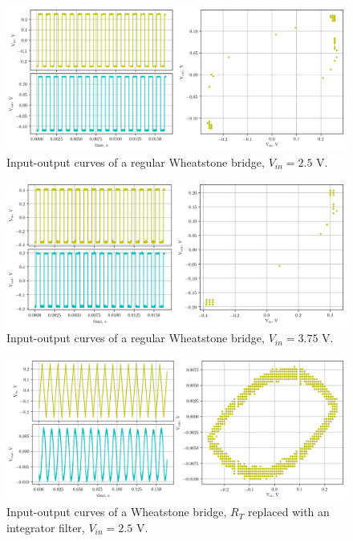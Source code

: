 \documentclass[12pt,a4paper,twoside]{article}
\begin{document}
\begin{figure}[!h]
    \centering
    \includegraphics[width = \textwidth]{r1.png}
    \caption{Input-output curves of a regular Wheatstone bridge, $V_{in} = 2.5$ V.}
    \label{fig:res-lo}
\end{figure}

\begin{figure}[!h]
    \centering
    \includegraphics[width = \textwidth]{r2.png}
    \caption{Input-output curves of a regular Wheatstone bridge, $V_{in} = 3.75$ V.}
    \label{fig:res-hi}
\end{figure}

\begin{figure}[!h]
    \centering
    \includegraphics[width = \textwidth]{c1.png}
    \caption{Input-output curves of a Wheatstone bridge, $R_T$ replaced with an integrator filter, $V_{in} = 2.5$ V.}
    \label{fig:cap-lo}
\end{figure}
\end{document}
